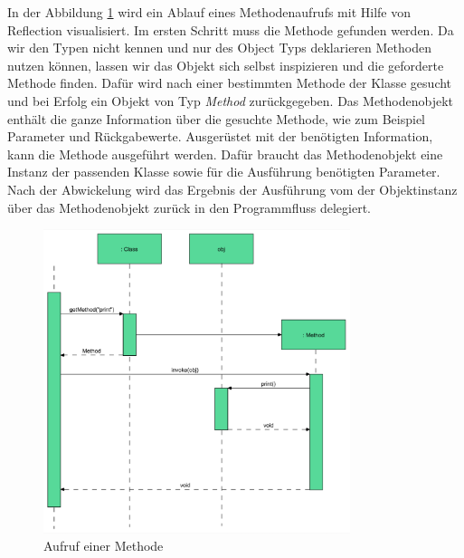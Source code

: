 In der Abbildung \ref{fig:reflection-fluss} wird ein Ablauf eines Methodenaufrufs mit Hilfe von Reflection visualisiert. Im ersten Schritt muss die Methode gefunden werden. 
Da wir den Typen nicht kennen und nur des Object Typs deklarieren Methoden nutzen können, lassen wir das Objekt sich selbst inspizieren und die geforderte Methode finden. Dafür wird nach einer bestimmten Methode der Klasse gesucht und bei Erfolg ein Objekt von Typ \textit{Method} zurückgegeben. Das Methodenobjekt enthält die ganze Information über die gesuchte Methode, wie zum Beispiel Parameter und Rückgabewerte. Ausgerüstet mit der benötigten Information, kann die Methode ausgeführt werden. Dafür braucht das Methodenobjekt eine Instanz der passenden Klasse sowie für die Ausführung benötigten Parameter. Nach der Abwickelung wird das Ergebnis der Ausführung vom der Objektinstanz über das Methodenobjekt zurück in den Programmfluss delegiert. 
\begin{figure}[h!]
  \centering
  \includegraphics[width=0.8\textwidth]{material/images/reflection-flussdiagram.png}
  \caption{Aufruf einer Methode}
  \label{fig:reflection-fluss}
\end{figure}

